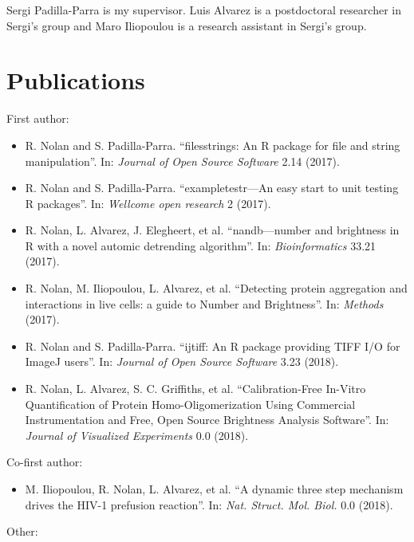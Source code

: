 \documentclass[12pt,]{book}
\providecommand{\tightlist}{%
  \setlength{\itemsep}{0pt}\setlength{\parskip}{0pt}}
\theoremstyle{definition}
\theoremstyle{definition}
\theoremstyle{definition}
\theoremstyle{remark}
\begin{document}
Sergi Padilla-Parra is my supervisor. Luis Alvarez is a postdoctoral
researcher in Sergi's group and Maro Iliopoulou is a research assistant
in Sergi's group.

\section*{Publications}\label{publications}

First author:

\begin{itemize}
\tightlist
\item
  R. Nolan and S. Padilla-Parra. ``filesstrings: An R package for file
  and string manipulation''. In: \emph{Journal of Open Source Software}
  2.14 (2017).
\item
  R. Nolan and S. Padilla-Parra. ``exampletestr---An easy start to unit
  testing R packages''. In: \emph{Wellcome open research} 2 (2017).
\item
  R. Nolan, L. Alvarez, J. Elegheert, et al. ``nandb---number and
  brightness in R with a novel automic detrending algorithm''. In:
  \emph{Bioinformatics} 33.21 (2017).
\item
  R. Nolan, M. Iliopoulou, L. Alvarez, et al. ``Detecting protein
  aggregation and interactions in live cells: a guide to Number and
  Brightness''. In: \emph{Methods} (2017).
\item
  R. Nolan and S. Padilla-Parra. ``ijtiff: An R package providing TIFF
  I/O for ImageJ users''. In: \emph{Journal of Open Source Software}
  3.23 (2018).
\item
  R. Nolan, L. Alvarez, S. C. Griffiths, et al. ``Calibration-Free
  In-Vitro Quantification of Protein Homo-Oligomerization Using
  Commercial Instrumentation and Free, Open Source Brightness Analysis
  Software''. In: \emph{Journal of Visualized Experiments} 0.0 (2018).
\end{itemize}

Co-first author:

\begin{itemize}
\tightlist
\item
  M. Iliopoulou, R. Nolan, L. Alvarez, et al. ``A dynamic three step
  mechanism drives the HIV-1 prefusion reaction''. In: \emph{Nat.
  Struct. Mol. Biol.} 0.0 (2018).
\end{itemize}

Other:
\end{document}
